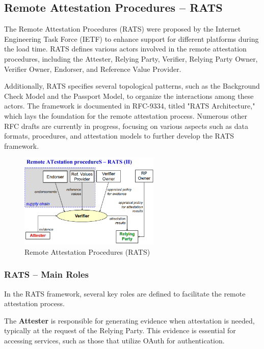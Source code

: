 \subsection{Remote Attestation Procedures – RATS}

The Remote Attestation Procedures (RATS) were proposed by the Internet
Engineering Task Force (IETF) to enhance support for different
platforms during the load time. RATS defines various actors involved
in the remote attestation procedures, including the Attester, Relying
Party, Verifier, Relying Party Owner, Verifier Owner, Endorser, and
Reference Value Provider.

Additionally, RATS specifies several topological patterns, such as the
Background Check Model and the Passport Model, to organize the
interactions among these actors. The framework is documented in
RFC-9334, titled "RATS Architecture," which lays the foundation for
the remote attestation process. Numerous other RFC drafts are
currently in progress, focusing on various aspects such as data
formats, procedures, and attestation models to further develop the
RATS framework.

\begin{figure}[H]
  \centering
  \includegraphics[width=0.6\textwidth]{img/RATS.png}
  \caption{Remote Attestation Procedures (RATS)}
\end{figure}

\subsubsection{RATS – Main Roles}

In the RATS framework, several key roles are defined to facilitate the
remote attestation process. 

The \textbf{Attester} is responsible for generating evidence when
attestation is needed, typically at the request of the Relying Party.
This evidence is essential for accessing services, such as those that
utilize OAuth for authentication.

